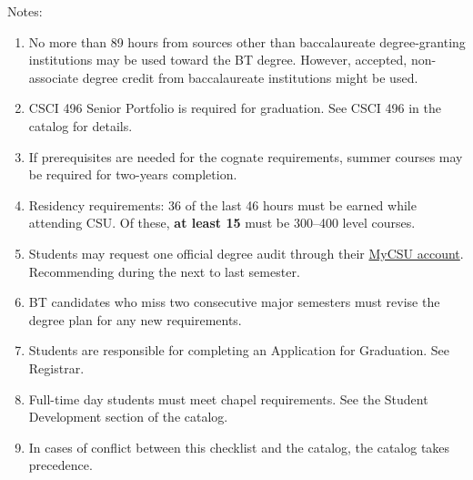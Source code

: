 Notes:%
\begin{enumerate}\footnotesize
	\item No more than 89 hours from sources other than baccalaureate degree-granting institutions may be used toward the BT degree. However, accepted, non-associate degree credit from baccalaureate institutions might be used.
	\item\label{note:bt-cs:portfolio} CSCI 496 Senior Portfolio is required for graduation. See CSCI 496 in the catalog for details.
	\item If prerequisites are needed for the cognate requirements, summer courses may be required for two-years completion.
	\item Residency requirements: 36 of the last 46 hours must be earned while attending CSU\@. Of these, \textbf{at least 15} must be 300--400 level courses.
	\item Students may request one official degree audit through their \href{https://portal.csuniv.edu/}{MyCSU account}. Recommending during the next to last semester.
	\item BT candidates who miss two consecutive major semesters must revise the degree plan for any new requirements.
	\item Students are responsible for completing an Application for Graduation. See Registrar.
	\item Full-time day students must meet chapel requirements. See the Student Development section of the catalog.
	\item In cases of conflict between this checklist and the catalog, the catalog takes precedence.
\end{enumerate}